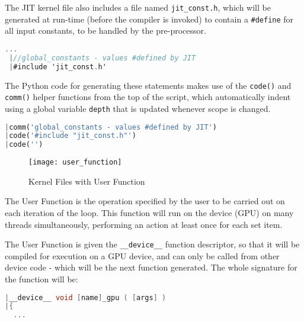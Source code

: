 
The JIT kernel file also includes a file named \verb|jit_const.h|, which will be generated at run-time (before the compiler is invoked) to contain a \verb|#define| for all input constants, to be handled by the pre-processor.
\begin{lstlisting}[backgroundcolor = \color{green!20}, language=C]
 ...
 |//global_constants - values #defined by JIT
 |#include 'jit_const.h'
\end{lstlisting}

\noindent The Python code for generating these statements makes use of the \verb|code()| and \verb|comm()| helper functions from the top of the script, which automatically indent using a global variable \verb|depth| that is updated whenever scope is changed.

\begin{lstlisting}[backgroundcolor = \color{lightgray!20}, language=Python]
|comm('global_constants - values #defined by JIT')
|code('#include "jit_const.h"')
|code('')
\end{lstlisting}
\clearpage

\begin{wrapfigure}[13]{r}{.33\textwidth}
  \centering
  \caption{Kernel Files with User Function}
  \label{fig:usr_func}
  \texttt{[image: user\_function]}
\end{wrapfigure}
The User Function is the operation specified by the user to be carried out on each iteration of the loop. This function will run on the device (GPU) on many threads simultaneously, performing an action at least once for each set item.
\par
The User Function is given the \verb|__device__| function  descriptor, so that it will be compiled for execution on a GPU device, and can only be called from other device code - which will be the next function generated. The whole signature for the function will be:
\begin{lstlisting}[language=C, backgroundcolor=\color{red!20}]
|__device__ void [name]_gpu ( [args] )
|{
  ...
\end{lstlisting}

